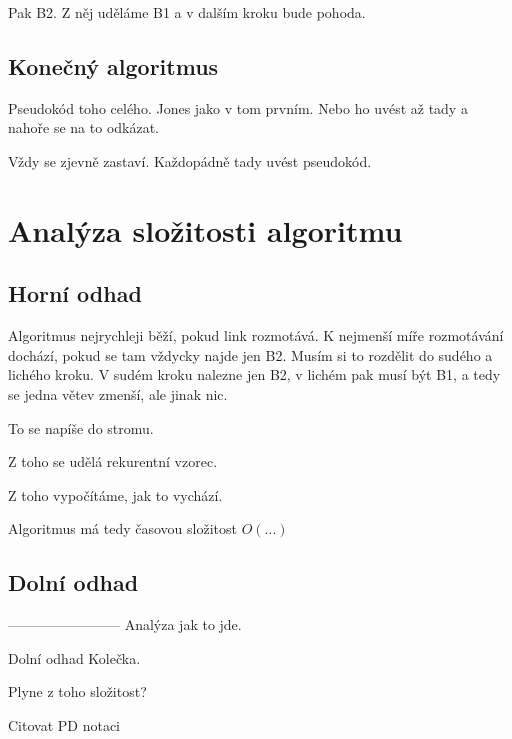 Pak B2. Z něj uděláme B1 a v dalším kroku bude pohoda.

\subsection{Konečný algoritmus}
Pseudokód toho celého. Jones jako v tom prvním. Nebo ho uvést až tady a nahoře se na to odkázat.

Vždy se zjevně zastaví.
Každopádně tady uvést pseudokód.
\section{Analýza složitosti algoritmu}
\subsection{Horní odhad}
Algoritmus nejrychleji běží, pokud link rozmotává. K nejmenší míře rozmotávání dochází, pokud se tam vždycky najde jen B2. Musím si to rozdělit do sudého a lichého kroku. V sudém kroku nalezne jen B2, v lichém pak musí být B1, a tedy se jedna větev zmenší, ale jinak nic.

To se napíše do stromu.

Z toho se udělá rekurentní vzorec.

Z toho vypočítáme, jak to vychází.

Algoritmus má tedy časovou složitost $O(...)$

\subsection{Dolní odhad}
------------------------
Analýza jak to jde.

Dolní odhad
Kolečka.

Plyne z toho složitost?

Citovat PD notaci